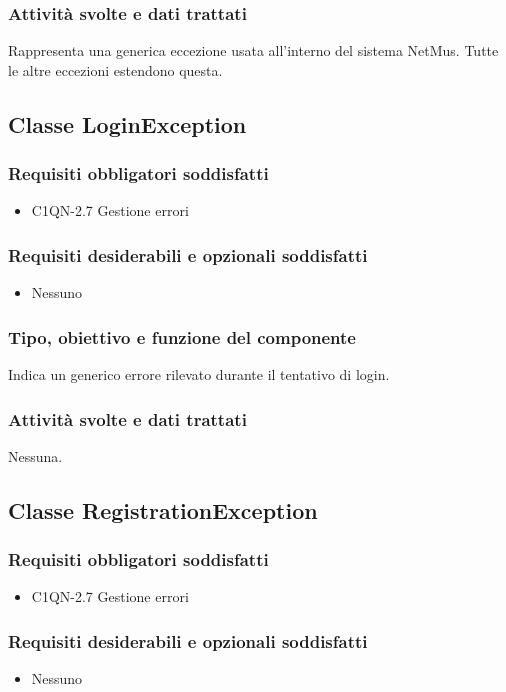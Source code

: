 \subsubsection*{Attivit\`a svolte e dati trattati}
Rappresenta una generica eccezione usata all'interno del sistema NetMus. Tutte
le altre eccezioni estendono questa.

\subsection{Classe LoginException}
\subsubsection*{Requisiti obbligatori soddisfatti}
\begin{itemize}
	\item C1QN-2.7 Gestione errori
\end{itemize}
\subsubsection*{Requisiti desiderabili e opzionali soddisfatti}
\begin{itemize}
    \item Nessuno
\end{itemize}
\subsubsection*{Tipo, obiettivo e funzione del componente}
Indica un generico errore rilevato durante il tentativo di login.
\subsubsection*{Attivit\`a svolte e dati trattati}
Nessuna.

\subsection{Classe RegistrationException}
\subsubsection*{Requisiti obbligatori soddisfatti}
\begin{itemize}
	\item C1QN-2.7 Gestione errori
\end{itemize}
\subsubsection*{Requisiti desiderabili e opzionali soddisfatti}
\begin{itemize}
    \item Nessuno
\end{itemize}
